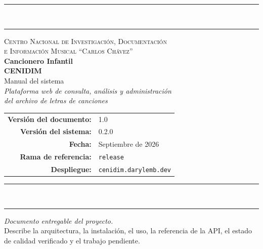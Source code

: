\documentclass[11pt,letterpaper,twoside]{report}
\providecommand{\nopagecolor}{\pagecolor{white}} %
\newcommand{\codigo}[1]{\texttt{#1}}
\begin{document}
\begin{titlepage}
  \pagecolor{cenidim-crema}
  \begin{center}
    \vspace*{1.5cm}

    {\color{cenidim-mostaza}\rule{\textwidth}{1.5pt}}\\[4pt]
    {\color{cenidim-vino}\rule{\textwidth}{0.6pt}}

    \vspace{2.2cm}
    {\small\scshape Centro Nacional de Investigación, Documentación\\[2pt]
     e Información Musical ``Carlos Chávez''}\\[1.8cm]

    {\Huge\bfseries\color{cenidim-vino} Cancionero Infantil\\[6pt] CENIDIM}\\[0.9cm]
    {\LARGE\color{cenidim-tinta} Manual del sistema}\\[0.5cm]
    {\large\itshape Plataforma web de consulta, análisis y administración\\ del archivo de letras de canciones}

    \vspace{2.6cm}
    \begin{tabular}{rl}
      \textbf{Versión del documento:} & 1.0 \\
      \textbf{Versión del sistema:}   & 0.2.0 \\
      \textbf{Fecha:}                 & Septiembre de 2026 \\
      \textbf{Rama de referencia:}    & \codigo{release} \\
      \textbf{Despliegue:}            & \codigo{cenidim.darylemb.dev} \\
    \end{tabular}

    \vfill
    {\color{cenidim-vino}\rule{\textwidth}{0.6pt}}\\[4pt]
    {\color{cenidim-mostaza}\rule{\textwidth}{1.5pt}}
  \end{center}
\end{titlepage}
\nopagecolor

\thispagestyle{empty}
\vspace*{6cm}
\begin{center}
  {\large\itshape Documento entregable del proyecto.}\\[4pt]
  {\small Describe la arquitectura, la instalación, el uso, la referencia
   de la API, el estado de calidad verificado y el trabajo pendiente.}
\end{center}
\cleardoublepage
\end{document}
